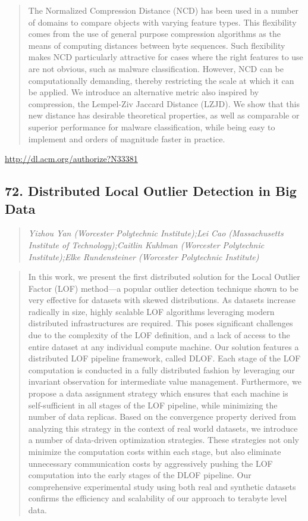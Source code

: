 \documentclass{article}
\begin{document}
\begin{quote}
The Normalized Compression Distance (NCD) has been used in a number of domains to compare objects with varying feature types. This flexibility comes from the use of general purpose compression algorithms as the means of computing distances between byte sequences. Such flexibility makes NCD particularly attractive for cases where the right features to use are not obvious, such as malware classification. However, NCD can be computationally demanding, thereby restricting the scale at which it can be applied. We introduce an alternative metric also inspired by compression, the Lempel-Ziv Jaccard Distance (LZJD). We show that this new distance has desirable theoretical properties, as well as comparable or superior performance for malware classification, while being easy to implement and orders of magnitude faster in practice.
\end{quote}

\href{http://dl.acm.org/authorize?N33381}{http://dl.acm.org/authorize?N33381}

\subsection{72. Distributed Local Outlier Detection in Big Data}

\begin{quote}
\footnotesize{\textit{Yizhou Yan (Worcester Polytechnic Institute);Lei Cao (Massachusetts Institute of Technology);Caitlin Kuhlman (Worcester Polytechnic Institute);Elke Rundensteiner (Worcester Polytechnic Institute)}}

\end{quote}

\begin{quote}
In this work, we present the first distributed solution for the Local Outlier Factor (LOF) method—a popular outlier detection technique shown to be very effective for datasets with skewed distributions. As datasets increase radically in size, highly scalable LOF algorithms leveraging modern distributed infrastructures are required. This poses significant challenges due to the complexity of the LOF definition, and a lack of access to the entire dataset at any individual compute machine. Our solution features a distributed LOF pipeline framework, called DLOF. Each stage of the LOF computation is conducted in a fully distributed fashion by leveraging our invariant observation for intermediate value management. Furthermore, we propose a data assignment strategy which ensures that each machine is self-sufficient in all stages of the LOF pipeline, while minimizing the number of data replicas. Based on the convergence property derived from analyzing this strategy in the context of real world datasets, we introduce a number of data-driven optimization strategies. These strategies not only minimize the computation costs within each stage, but also eliminate unnecessary communication costs by aggressively pushing the LOF computation into the early stages of the DLOF pipeline. Our comprehensive experimental study using both real and synthetic datasets confirms the efficiency and scalability of our approach to terabyte level data.
\end{quote}
\end{document}
